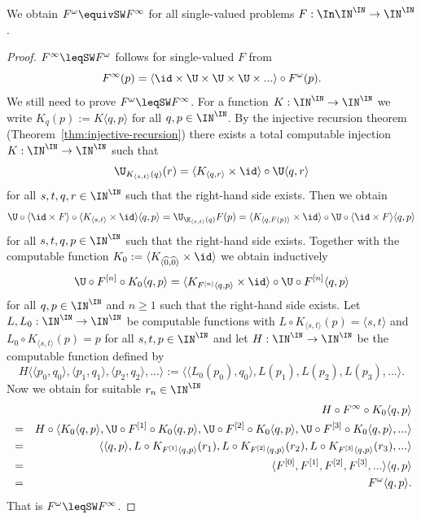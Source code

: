 \documentclass{lmcs}
\begin{document}
\begin{prop}
\label{prop:inverse-omega}
We obtain $F^\omega\equivSW F^\infty$ for all single-valued problems $F:\In\IN^\IN\to\IN^\IN$.
\end{prop}
\begin{proof}
$F^\infty\leqSW F^\omega$ follows for single-valued $F$ from
\[F^\infty(p)=\langle\id\times\U\times\U\times\U\times...\rangle\circ F^\omega(p).\]
We still need to prove $F^\omega\leqSW F^\infty$. 
For a function $K:\IN^\IN\to\IN^\IN$ we write $K_q(p):=K\langle q,p\rangle$ for all $q,p\in\IN^\IN$.
By the injective recursion theorem (Theorem~\ref{thm:injective-recursion}) there exists a total computable injection
$K:\IN^\IN\to\IN^\IN$ such that
\[\U_{K_{\langle s,t\rangle}(q)}(r)=\langle K_{\langle q,r\rangle}\times\id\rangle\circ\U\langle q,r\rangle\]
for all $s,t,q,r\in\IN^\IN$ such that the right-hand side exists.
Then we obtain
\[\U\circ\langle\id\times F\rangle\circ \langle K_{\langle s,t\rangle}\times\id\rangle\langle q,p\rangle
=\U_{\K_{\langle s,t\rangle}(q)}F(p)=\langle K_{\langle q,F(p)\rangle}\times\id\rangle\circ\U\circ\langle \id\times F\rangle\langle q,p\rangle\]
for all $s,t,q,p\in\IN^\IN$ such that the right-hand side exists. 
Together with the computable function $K_0:=\langle K_{\langle\widehat{0},\widehat{0}\rangle}\times\id\rangle$
we obtain inductively
\[\U\circ F^{[n]}\circ K_0\langle q,p\rangle=\langle K_{F^{[n]}\langle q,p\rangle}\times\id\rangle\circ\U\circ F^{[n]}\langle q,p\rangle\]
for all $q,p\in\IN^\IN$ and $n\geq1$ such that the right-hand side exists.
Let $L,L_0:\IN^\IN\to\IN^\IN$ be computable functions with $L\circ K_{\langle s,t\rangle}(p)=\langle s,t\rangle$ 
and $L_0\circ K_{\langle s,t\rangle}(p)=p$ for all
$s,t,p\in\IN^\IN$ and let $H:\IN^\IN\to\IN^\IN$ be the computable function defined by
\[H\langle\langle p_0,q_0\rangle,\langle p_1,q_1\rangle,\langle p_2,q_2\rangle,...\rangle:=\langle \langle L_0(p_0),q_0\rangle,L(p_1),L(p_2),L(p_3),...\rangle.\]
Now we obtain for suitable $r_n\in\IN^\IN$
\begin{eqnarray*}
&&H\circ F^\infty\circ K_0\langle q,p\rangle\\
&=& H\circ\langle K_0\langle q,p\rangle,\U\circ F^{[1]}\circ K_0\langle q,p\rangle,\U\circ F^{[2]}\circ K_0\langle q,p\rangle,\U\circ F^{[3]}\circ K_0\langle q,p\rangle,...\rangle\\
 &=& \langle \langle q,p\rangle,L\circ K_{F^{[1]}\langle q,p\rangle}(r_1),L\circ K_{F^{[2]}\langle q,p\rangle}(r_2),L\circ K_{F^{[3]}\langle q,p\rangle}(r_3),...\rangle\\
 &=& \langle F^{[0]},F^{[1]},F^{[2]},F^{[3]},...\rangle\langle q,p\rangle\\
 &=& F^\omega\langle q,p\rangle.
\end{eqnarray*}
That is $F^\omega\leqSW F^\infty$.
\end{proof}
\end{document}
